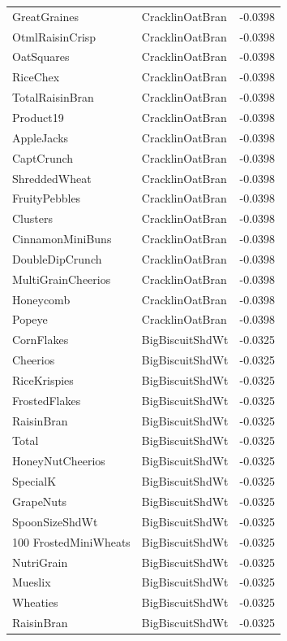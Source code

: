 \begin{longtable}{llr}
GreatGraines & CracklinOatBran & -0.0398 \\
OtmlRaisinCrisp & CracklinOatBran & -0.0398 \\
OatSquares & CracklinOatBran & -0.0398 \\
RiceChex & CracklinOatBran & -0.0398 \\
TotalRaisinBran & CracklinOatBran & -0.0398 \\
Product19 & CracklinOatBran & -0.0398 \\
AppleJacks & CracklinOatBran & -0.0398 \\
CaptCrunch & CracklinOatBran & -0.0398 \\
ShreddedWheat & CracklinOatBran & -0.0398 \\
FruityPebbles & CracklinOatBran & -0.0398 \\
Clusters & CracklinOatBran & -0.0398 \\
CinnamonMiniBuns & CracklinOatBran & -0.0398 \\
DoubleDipCrunch & CracklinOatBran & -0.0398 \\
MultiGrainCheerios & CracklinOatBran & -0.0398 \\
Honeycomb & CracklinOatBran & -0.0398 \\
Popeye & CracklinOatBran & -0.0398 \\
CornFlakes & BigBiscuitShdWt & -0.0325 \\
Cheerios & BigBiscuitShdWt & -0.0325 \\
RiceKrispies & BigBiscuitShdWt & -0.0325 \\
FrostedFlakes & BigBiscuitShdWt & -0.0325 \\
RaisinBran & BigBiscuitShdWt & -0.0325 \\
Total & BigBiscuitShdWt & -0.0325 \\
HoneyNutCheerios & BigBiscuitShdWt & -0.0325 \\
SpecialK & BigBiscuitShdWt & -0.0325 \\
GrapeNuts & BigBiscuitShdWt & -0.0325 \\
SpoonSizeShdWt & BigBiscuitShdWt & -0.0325 \\
100%
FrostedMiniWheats & BigBiscuitShdWt & -0.0325 \\
NutriGrain & BigBiscuitShdWt & -0.0325 \\
Mueslix & BigBiscuitShdWt & -0.0325 \\
Wheaties & BigBiscuitShdWt & -0.0325 \\
RaisinBran & BigBiscuitShdWt & -0.0325 \\

\end{longtable}
